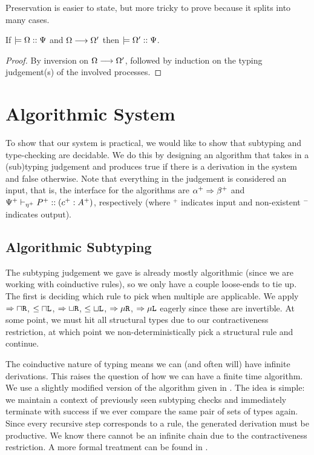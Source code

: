 \documentclass[a4paper,USenglish]{lipics-v2016}
\begin{document}
Preservation is easier to state, but more tricky to prove because it splits into many cases.
\begin{theorem}[Preservation]
If $\models {\Omega} :: {\Psi}$ and $\Omega \longrightarrow \Omega'$ then $\models {\Omega'} :: {\Psi}$.
\end{theorem}
\begin{proof}
  By inversion on $\Omega \longrightarrow \Omega'$, followed by induction on the typing judgement(s) of the involved processes.
\end{proof}


\section{Algorithmic System}
\label{algorithmic}

To show that our system is practical, we would like to show that subtyping and type-checking are decidable. We do this by designing an algorithm that takes in a (sub)typing judgement and produces true if there is a derivation in the system and false otherwise. Note that everything in the judgement is considered an input, that is, the interface for the algorithms are $\alpha^+ \Rightarrow \beta^+$ and ${\Psi^+} \vdash_{\eta^+} P^+ :: (c^+ : A^+)$, respectively (where $^+$ indicates input and non-existent $^-$ indicates output). 


\subsection{Algorithmic Subtyping}

The subtyping judgement we gave is already mostly algorithmic (since we are working with coinductive rules), so we only have a couple loose-ends to tie up. The first is deciding which rule to pick when multiple are applicable. We apply $\Rightarrow{\mathbin{\sqcap}\texttt{R}}$, $\le{\mathbin{\sqcap}\texttt{L}}$, $\Rightarrow{\mathbin{\sqcup}\texttt{R}}$, $\le{\mathbin{\sqcup}\texttt{L}}$, $\Rightarrow{\mu\texttt{R}}$, $\Rightarrow{\mu\texttt{L}}$ eagerly since these are invertible. At some point, we must hit all structural types due to our contractiveness restriction, at which point we non-deterministically pick a structural rule and continue. 

The coinductive nature of typing means we can (and often will) have infinite derivations. This raises the question of how we can have a finite time algorithm. We use a slightly modified version of the algorithm given in \cite{GayH05}. The idea is simple: we maintain a context of previously seen subtyping checks and immediately terminate with success if we ever compare the same pair of sets of types again. Since every recursive step corresponds to a rule, the generated derivation must be productive. We know there cannot be an infinite chain due to the contractiveness restriction. A more formal treatment can be found in \cite{StoneS2005}.
\end{document}

